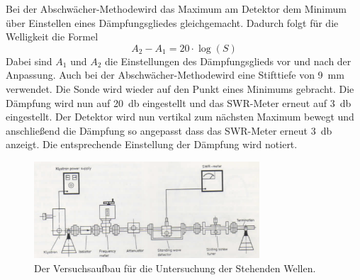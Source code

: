         Bei der \glqq Abschwächer-Methode\glqq  wird das Maximum am Detektor dem Minimum über Einstellen eines Dämpfungsgliedes gleichgemacht. Dadurch folgt für die Welligkeit die Formel
        \begin{equation}
            A_2 - A_1 = 20\cdot \log\left(S\right)
        \end{equation}
        Dabei sind $A_1$ und $A_2$ die Einstellungen des Dämpfungsglieds vor und nach der Anpassung.
        Auch bei der \glqq Abschwächer-Methode\glqq  wird eine Stifttiefe von \SI{9}{\milli\metre} verwendet.
        Die Sonde wird wieder auf den Punkt eines Minimums gebracht.
        Die Dämpfung wird nun auf \SI{20}{\decibel} eingestellt und das SWR-Meter erneut auf \SI{3}{\decibel} eingestellt.
        Der Detektor wird nun vertikal zum nächsten Maximum bewegt und anschließend die Dämpfung so angepasst dass das SWR-Meter erneut \SI{3}{\decibel} anzeigt.
        Die entsprechende Einstellung der Dämpfung wird notiert.
        \begin{figure}[H]
            \centering
            \includegraphics[width = 0.75\textwidth]{bilder/Aufbau_Teil3.png}
            \caption{Der Versuchsaufbau für die Untersuchung der Stehenden Wellen.}
            \label{fig:Teil3}
        \end{figure}